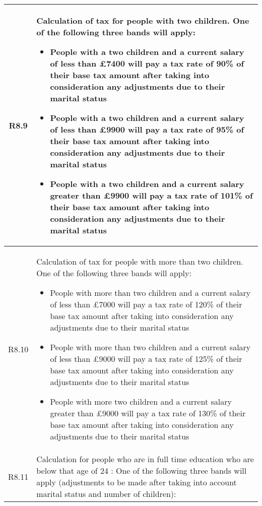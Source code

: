 \begin{table}[H]
\small
\centering
\begin{tabularx}{\textwidth}{| c | X |}
	\hline %
	R8.9 & Calculation of tax for people with two children. One of the following three bands will apply:
	\begin{itemize}[itemsep=\tableitemsep, leftmargin=\tableleftsep]
		\item People with a two children and a current salary of less than £7400 will pay a tax rate of 90\% of their base tax amount after taking into consideration any adjustments due to their marital status
		\item People with a two children and a current salary of less than £9900 will pay a tax rate of 95\% of their base tax amount after taking into consideration any adjustments due to their marital status
		\item People with a two children and a current salary greater than £9900 will pay a tax rate of 101\% of their base tax amount after taking into consideration any adjustments due to their marital status
	\end{itemize}
	\\
	\hline %
	R8.10 & Calculation of tax for people with more than two children. One of the following three bands will apply:
	\begin{itemize}[itemsep=\tableitemsep, leftmargin=\tableleftsep]
		\item People with more than two children and a current salary of less than £7000 will pay a tax rate of 120\% of their base tax amount after taking into consideration any adjustments due to their marital status
		\item People with more than two children and a current salary of less than £9000 will pay a tax rate of 125\% of their base tax amount after taking into consideration any adjustments due to their marital status
		\item People with more two children and a current salary greater than £9000 will pay a tax rate of 130\% of their base tax amount after taking into consideration any adjustments due to their marital status
	\end{itemize}
	\\
	\hline %
	R8.11 & Calculation for people who are in full time education who are below that age of 24 : One of the following three bands will apply (adjustments to be made after taking into account marital status and number of children):

\end{tabularx}
\end{table}
